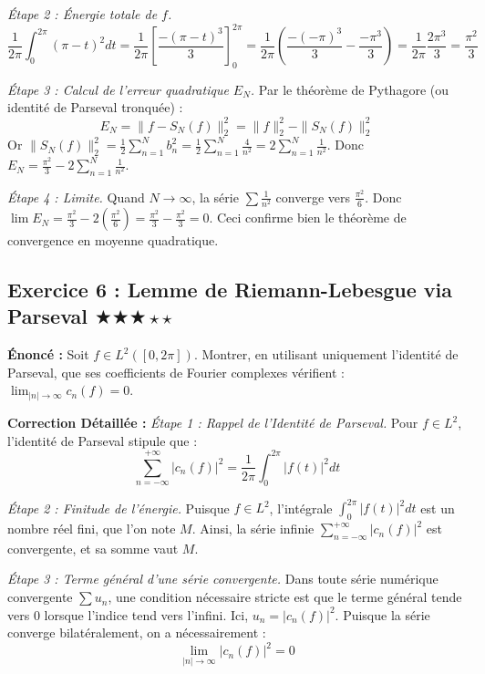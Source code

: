 \documentclass[11pt,a4paper]{article}
\begin{document}
\textit{Étape 2 : Énergie totale de $f$.}
$$\frac{1}{2\pi} \int_0^{2\pi} (\pi - t)^2 dt = \frac{1}{2\pi} \left[ \frac{-(\pi - t)^3}{3} \right]_0^{2\pi} = \frac{1}{2\pi} \left( \frac{-(-\pi)^3}{3} - \frac{-\pi^3}{3} \right) = \frac{1}{2\pi} \frac{2\pi^3}{3} = \frac{\pi^2}{3}$$

\textit{Étape 3 : Calcul de l'erreur quadratique $E_N$.}
Par le théorème de Pythagore (ou identité de Parseval tronquée) :
$$E_N = \| f - S_N(f) \|_2^2 = \| f \|_2^2 - \| S_N(f) \|_2^2$$
Or $\| S_N(f) \|_2^2 = \frac{1}{2} \sum_{n=1}^N b_n^2 = \frac{1}{2} \sum_{n=1}^N \frac{4}{n^2} = 2 \sum_{n=1}^N \frac{1}{n^2}$.
Donc $E_N = \frac{\pi^2}{3} - 2 \sum_{n=1}^N \frac{1}{n^2}$.

\textit{Étape 4 : Limite.}
Quand $N \to \infty$, la série $\sum \frac{1}{n^2}$ converge vers $\frac{\pi^2}{6}$.
Donc $\lim E_N = \frac{\pi^2}{3} - 2 \left( \frac{\pi^2}{6} \right) = \frac{\pi^2}{3} - \frac{\pi^2}{3} = 0$.
Ceci confirme bien le théorème de convergence en moyenne quadratique.

\vspace{1cm}
\subsection*{Exercice 6 : Lemme de Riemann-Lebesgue via Parseval $\bigstar\bigstar\bigstar\star\star$}

\textbf{Énoncé :} Soit $f \in L^2([0, 2\pi])$. Montrer, en utilisant uniquement l'identité de Parseval, que ses coefficients de Fourier complexes vérifient : $\lim_{|n| \to \infty} c_n(f) = 0$.

\textbf{Correction Détaillée :}
\textit{Étape 1 : Rappel de l'Identité de Parseval.}
Pour $f \in L^2$, l'identité de Parseval stipule que :
$$\sum_{n=-\infty}^{+\infty} |c_n(f)|^2 = \frac{1}{2\pi} \int_0^{2\pi} |f(t)|^2 dt$$

\textit{Étape 2 : Finitude de l'énergie.}
Puisque $f \in L^2$, l'intégrale $\int_0^{2\pi} |f(t)|^2 dt$ est un nombre réel fini, que l'on note $M$.
Ainsi, la série infinie $\sum_{n=-\infty}^{+\infty} |c_n(f)|^2$ est convergente, et sa somme vaut $M$.

\textit{Étape 3 : Terme général d'une série convergente.}
Dans toute série numérique convergente $\sum u_n$, une condition nécessaire stricte est que le terme général tende vers $0$ lorsque l'indice tend vers l'infini.
Ici, $u_n = |c_n(f)|^2$.
Puisque la série converge bilatéralement, on a nécessairement :
$$\lim_{|n| \to \infty} |c_n(f)|^2 = 0$$
\end{document}
